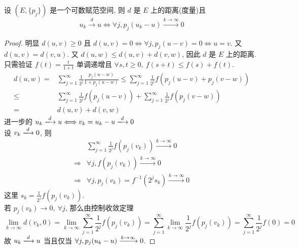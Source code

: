 \documentclass[11pt]{ctexart}[UTF8]
\begin{document}
\begin{theorem}
    设 $(E, \{p_j\})$ 是一个可数赋范空间, 则 $d$ 是 $E$ 上的距离(度量)且
    \begin{equation*}
        u_{k} \xrightarrow{d} u \Leftrightarrow \forall j, p_j(u_k - u) \xrightarrow{k \to \infty} 0
    \end{equation*}
\end{theorem}
\begin{proof}
    明显 $d(u,v) \geq 0$ 且 $d(u,v) = 0 \Leftrightarrow \forall j, p_j(u-v) = 0 \Leftrightarrow u = v$. 又 $d(u,v) = d(v,u)$.
    又 $d(u,w) \leq d(u,v) + d(v,w)$, 因此 $d$ 是 $E$ 上的距离. 只需验证 $f(t) = \frac{t}{1+t}$ 单调递增且 $\forall s,t \geq 0,\ f(s+t) \leq f(s) + f(t)$.
    \begin{equation*}
        \begin{aligned}
            d(u,w) = & \sum\limits_{j=1}^{\infty} \frac{1}{2^j} \frac{p_j(u-w)}{1+p_j(u-w)} \leq \sum\limits_{j=1}^{\infty} \frac{1}{2^j} f(p_j(u-v) + p_j(v-w)) \\
            \leq & \sum\limits_{j=1}^{\infty} \frac{1}{2^j} f(p_j(u-v)) + \sum\limits_{j=1}^{\infty} \frac{1}{2^j} f(p_j(v-w)) \\
            = &d(u,v) + d(v,w)
        \end{aligned}
    \end{equation*}
    进一步的 $u_{k} \xlongrightarrow{d} u \Longleftrightarrow v_{k} = u_{k} - u \xlongrightarrow{d} 0$\\
    设 $v_{k} \xlongrightarrow{d} 0$, 则
    \begin{equation*}
        \begin{aligned}
            &\sum\limits_{j=1}^{\infty} \frac{1}{2^j} f(p_j(v_k)) \xrightarrow{k \to \infty} 0 \\
            \Longrightarrow & \forall j, f(p_j(v_k)) \xrightarrow{k \to \infty} 0 \\
            \Longrightarrow & \forall j, p_j(v_k) = f^{-1}(2^{j}s_{k}) \xrightarrow{k \to \infty} 0
        \end{aligned}
    \end{equation*}
    这里 $s_{k} = \frac{1}{2^j} f(p_j(v_k))$.\\
    若 $p_j(v_k) \to 0,\ \forall j$, 那么由控制收敛定理
    \begin{equation*}
        \lim\limits_{k \to \infty} d(v_{k}, 0) = \lim\limits_{k \to \infty} \sum\limits_{j=1}^{\infty} \frac{1}{2^j} f(p_j(v_k)) = \sum\limits_{j=1}^{\infty}\lim\limits_{k \to \infty} \frac{1}{2^j} f(p_j(v_k)) = \sum\limits_{j=1}^{\infty}\frac{1}{2^{j}}f(0)=0
    \end{equation*}
    故 $u_{k} \xlongrightarrow{d} u $ 当且仅当 $\forall j, p_j(u_k - u) \xlongrightarrow{k \to \infty} 0$.
\end{proof}
\end{document}

